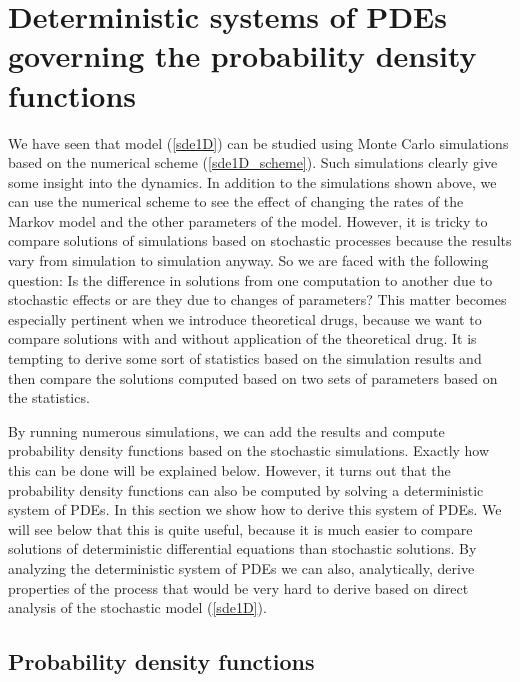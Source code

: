 \section[Probability density functions]{Deterministic systems of PDEs governing the probability density functions \label{sec:pdf}}

We have seen that model (\ref{sde1D}) can be studied using Monte Carlo simulations based on the numerical scheme (\ref{sde1D_scheme}). Such simulations clearly give some insight into the dynamics. In addition to the simulations shown above, we can use the numerical scheme to see the effect of changing the rates of the Markov model and the other parameters of the model. However, it is tricky to compare solutions of simulations based on stochastic processes because the results vary from simulation to simulation anyway. So we are faced with the following question: Is the difference in solutions from one computation to another due to stochastic effects or are they due to changes of parameters? This matter becomes especially pertinent when we introduce theoretical drugs, because we want to compare solutions with and without application of the theoretical drug. It is tempting to derive some sort of statistics based on the simulation results and then compare the solutions computed based on two sets of parameters based on the statistics.

 By running numerous simulations, we can add the results and compute probability density functions based on the stochastic simulations. Exactly how this can be done will be explained below. However, it turns out that the probability density functions can also be computed by solving a deterministic system of PDEs. In this section we show how to derive this system of PDEs. We will see below that this is quite useful, because it is much easier to compare solutions of deterministic differential equations than  stochastic solutions. By analyzing the deterministic system of PDEs we can also, analytically, derive properties of the process that would be very hard to derive based on direct analysis of the stochastic model (\ref{sde1D}).

\subsection{Probability density functions}

